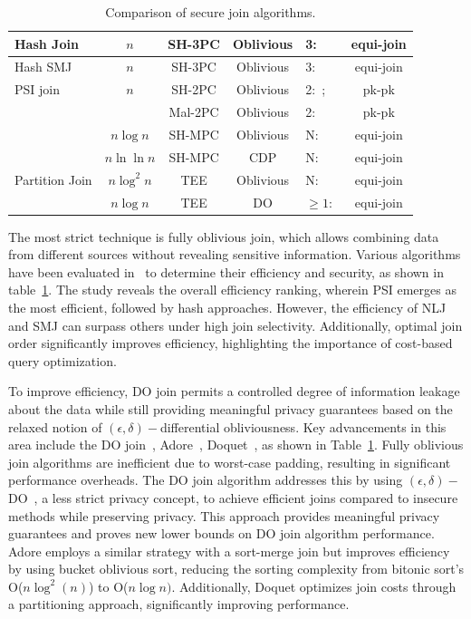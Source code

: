 \documentclass[11pt]{article}
\newcommand{\shortsection}[1]{\vspace{0.2em}\noindent {\bf #1.}}
\begin{document}
\begin{table}
\begin{tabular}{l|c|c|c|p{2.8cm}|c}
     Hash Join & $n$ & SH-3PC & Oblivious& 3:~\cite{mohassel2020fast} & equi-join \\ 
     \hline

     Hash SMJ & $n$ & SH-3PC & Oblivious& 3:~\cite{luo2024secure} & equi-join \\ 
     \hline

     PSI join & $n$ & SH-2PC & Oblivious & 2:~\cite{raghuraman2022blazing, wang2021secure}; & pk-pk \\
      & & Mal-2PC & Oblivious & 2:~\cite{raghuraman2022blazing} & pk-pk \\
      & $n \log n$  & SH-MPC & Oblivious & N:~\cite{ant2024scql} & equi-join \\
      & $n \ln \ln n$  & SH-MPC & CDP & N:~\cite{narayan2012djoin} & equi-join \\
      \hline
      
      Partition Join & $n \log ^2 n$   & TEE & Oblivious & N:~\cite{li2023soda} & equi-join \\
      & $n \log n$   & TEE & DO & $\geq 1$:~\cite{qiu2023doquet} & equi-join \\
    \end{tabular}
    \caption{Comparison of secure join algorithms.   }
    \label{tbl:joins}
\end{table}


\shortsection{Oblivious Join}
The most strict technique is fully oblivious join, which allows combining data from different sources without revealing sensitive information. Various algorithms have been evaluated in~\cite{li2024experimental} to determine their efficiency and security, as shown in table~\ref{tbl:joins}. The study reveals the overall efficiency ranking, wherein PSI emerges as the most efficient, followed by hash approaches. However, the efficiency of NLJ and SMJ can surpass others under high join selectivity. Additionally, optimal join order significantly improves efficiency, highlighting the importance of cost-based query optimization. 

\shortsection{DO Joins}
To improve efficiency, DO join permits a controlled degree of information leakage about the data while still providing meaningful privacy guarantees based on the relaxed notion of $(\epsilon, \delta)-$differential obliviousness. Key advancements in this area include the DO join~\cite{chu2021differentially}, Adore~\cite{qin2022adore}, Doquet~\cite{qiu2023doquet}, as shown in Table~\ref{tbl:joins}. Fully oblivious join algorithms are inefficient due to worst-case padding, resulting in significant performance overheads. The DO join algorithm addresses this by using $(\epsilon, \delta)-$DO~\cite{chan2022foundations}, a less strict privacy concept, to achieve efficient joins compared to insecure methods while preserving privacy. This approach provides meaningful privacy guarantees and proves new lower bounds on DO join algorithm performance. Adore employs a similar strategy with a sort-merge join but improves efficiency by using bucket oblivious sort, reducing the sorting complexity from bitonic sort's O($n \log^2(n)$) to O($n \log n)$. Additionally, Doquet optimizes join costs through a partitioning approach, significantly improving performance. 
\end{document}
